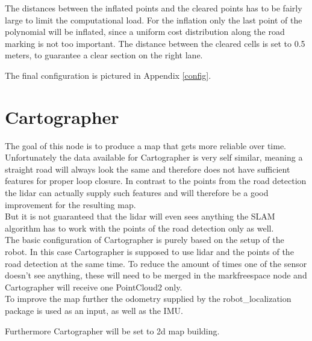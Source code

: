 The distances between the inflated points and the cleared points has to be fairly large to limit the computational load. For the inflation only the last point of the polynomial will be inflated, since a uniform cost distribution along the road marking is not too important. The distance between the cleared cells is set to 0.5 meters, to guarantee a clear section on the right lane.

The final configuration is pictured in Appendix \ref{config}.


\section{Cartographer}
The goal of this node is to produce a map that gets more reliable over time.\\

Unfortunately the data available for Cartographer is very self similar, meaning a straight road will always look the same and therefore does not have sufficient features for proper loop closure. In contrast to the points from the road detection the lidar can actually supply such features and will therefore be a good improvement for the resulting map.\\

But it is not guaranteed that the lidar will even sees anything the SLAM algorithm has to work with the points of the road detection only as well.\\

The basic configuration of Cartographer is purely based on the setup of the robot. In this case Cartographer is supposed to use lidar and the points of the road detection at the same time. To reduce the amount of times one of the sensor doesn't see anything, these will need to be merged in the markfreespace node and Cartographer will receive one PointCloud2 only.\\
To improve the map further the odometry supplied by the robot\_localization package is used as an input, as well as the IMU.

Furthermore Cartographer will be set to 2d map building.


